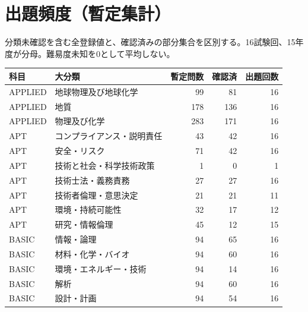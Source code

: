 \chapter{出題頻度（暫定集計）}
分類未確認を含む全登録値と、確認済みの部分集合を区別する。16試験回、15年度が分母。難易度未知を0として平均しない。
\begin{longtable}{p{.16\linewidth}p{.42\linewidth}rrr}
科目 & 大分類 & 暫定問数 & 確認済 & 出題回数\\\hline
APPLIED & 地球物理及び地球化学 & 99 & 81 & 16\\
APPLIED & 地質 & 178 & 136 & 16\\
APPLIED & 物理及び化学 & 283 & 171 & 16\\
APT & コンプライアンス・説明責任 & 43 & 42 & 16\\
APT & 安全・リスク & 71 & 42 & 16\\
APT & 技術と社会・科学技術政策 & 1 & 0 & 1\\
APT & 技術士法・義務責務 & 27 & 27 & 16\\
APT & 技術者倫理・意思決定 & 21 & 21 & 11\\
APT & 環境・持続可能性 & 32 & 17 & 12\\
APT & 研究・情報倫理 & 45 & 12 & 15\\
BASIC & 情報・論理 & 94 & 65 & 16\\
BASIC & 材料・化学・バイオ & 94 & 60 & 16\\
BASIC & 環境・エネルギー・技術 & 94 & 14 & 16\\
BASIC & 解析 & 94 & 60 & 16\\
BASIC & 設計・計画 & 94 & 54 & 16\\
\end{longtable}
